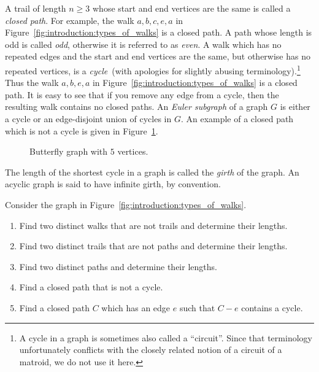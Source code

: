 A trail of length $n \geq 3$ whose start and end vertices
are the same is called a \emph{closed path}. For
example, the walk $a, b, c, e, a$ in
Figure~\ref{fig:introduction:types_of_walks} is a closed path. A path
whose length is odd is called \emph{odd}, otherwise it
is referred to as \emph{even}. A walk which has no
repeated edges and the start and end vertices are the same, but
otherwise has no repeated vertices, is a
\emph{cycle}~(with apologies for slightly abusing
terminology).\footnote{
  A cycle in a graph is sometimes also called a
  ``circuit''. Since that terminology unfortunately
  conflicts with the closely related notion of a circuit of a matroid,
  we do not use it here.
}
Thus the walk $a, b, e, a$ in
Figure~\ref{fig:introduction:types_of_walks} is a closed path. It is
easy to see that if you remove any edge from a cycle, then the
resulting walk contains no closed paths. An
\emph{Euler subgraph} of a graph $G$ is either a
cycle or an edge-disjoint union of cycles in $G$. An example of a
closed path which is not a cycle is given in
Figure~\ref{fig:introduction:butterfly_graph}.

\begin{figure}[!htbp]
\centering

\caption{Butterfly graph with $5$ vertices.}
\label{fig:introduction:butterfly_graph}
\end{figure}

The length of the shortest cycle in a graph is called the \emph{girth}
of the graph. An acyclic graph is said to have infinite girth, by
convention.

\begin{example}
\label{eg:introduction:walks_paths_trails}
Consider the graph in Figure~\ref{fig:introduction:types_of_walks}.
%
\begin{enumerate}
\item Find two distinct walks that are not trails and determine their
  lengths.

\item Find two distinct trails that are not paths and determine their
  lengths.

\item Find two distinct paths and determine their lengths.

\item Find a closed path that is not a cycle.

\item Find a closed path $C$ which has an edge $e$ such that $C - e$
  contains a cycle.
\end{enumerate}
\end{example}

